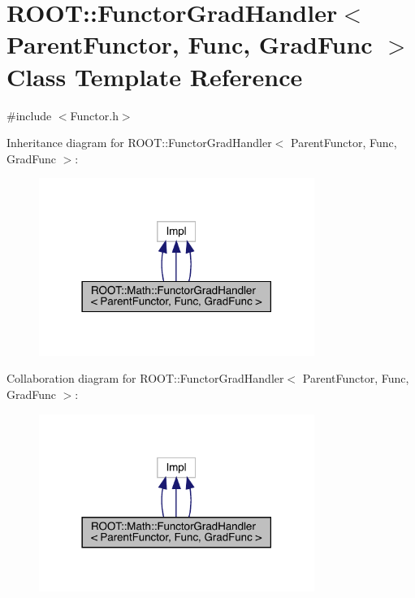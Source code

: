 \hypertarget{classROOT_1_1Math_1_1FunctorGradHandler}{}\section{R\+O\+OT\+:\+:Functor\+Grad\+Handler$<$ Parent\+Functor, Func, Grad\+Func $>$ Class Template Reference}
\label{classROOT_1_1Math_1_1FunctorGradHandler}


{\ttfamily \#include $<$Functor.\+h$>$}



Inheritance diagram for R\+O\+OT\+:\+:Functor\+Grad\+Handler$<$ Parent\+Functor, Func, Grad\+Func $>$\+:
\nopagebreak
\begin{figure}[H]
\begin{center}
\leavevmode
\includegraphics[width=254pt]{dd/dcc/classROOT_1_1Math_1_1FunctorGradHandler__inherit__graph}
\end{center}
\end{figure}


Collaboration diagram for R\+O\+OT\+:\+:Functor\+Grad\+Handler$<$ Parent\+Functor, Func, Grad\+Func $>$\+:
\nopagebreak
\begin{figure}[H]
\begin{center}
\leavevmode
\includegraphics[width=254pt]{df/d09/classROOT_1_1Math_1_1FunctorGradHandler__coll__graph}
\end{center}
\end{figure}
